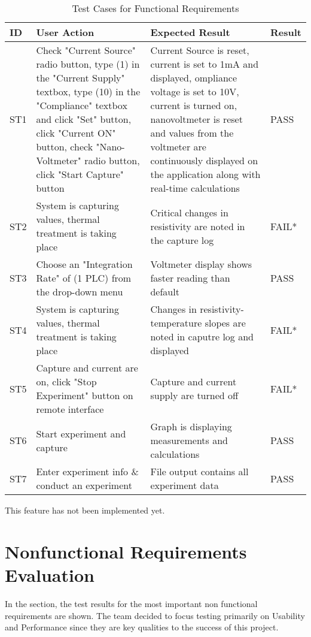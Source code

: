 \documentclass[12pt, titlepage]{article}
\begin{document}
\begin{table}[H]
	\centering
	\caption{Test Cases for Functional Requirements}
	\label{my-label}
	\begin{tabular}{|p{0.85cm}|p{5cm}|p{5cm}|p{1.3cm}|}
		\hline
		\textbf{ID} & \textbf{User Action} & \textbf{Expected Result}  & \textbf{Result} \\ \hline
		ST1 & Check "Current Source" radio button, type (1) in the "Current Supply" textbox, type (10) in the "Compliance" textbox and click "Set" button, click "Current ON" button, check "Nano-Voltmeter" radio button, click "Start Capture" button & Current Source is reset, current  is set to 1mA and displayed, ompliance voltage is set to 10V, current is turned on, nanovoltmeter is reset and values from the voltmeter are continuously displayed on the application along with real-time calculations & PASS\\ \hline
		ST2 & System is capturing values, thermal treatment is taking place & Critical changes in resistivity are noted in the capture log & FAIL*\\ \hline
		ST3 & Choose an "Integration Rate" of (1 PLC) from the drop-down menu & Voltmeter display shows faster reading than default & PASS\\ \hline
		ST4 & System is capturing values, thermal treatment is taking place & Changes in resistivity-temperature slopes are noted in caputre log and displayed & FAIL*\\ \hline
		ST5 & Capture and current are on, click "Stop Experiment" button on remote interface & Capture and current supply are turned off & FAIL* \\ \hline
		ST6 & Start experiment and capture & Graph is displaying measurements and calculations & PASS \\ \hline
		ST7 & Enter experiment info \& conduct an experiment & File output contains all experiment data & PASS \\ \hline
	\end{tabular}
\end{table}
\noindent * This feature has not been implemented yet.

\newpage

\section{Nonfunctional Requirements Evaluation}

In the section, the test results for the most important non functional requirements are shown. The team decided to focus testing primarily on Usability and Performance since they are key qualities to the success of this project.
\end{document}
